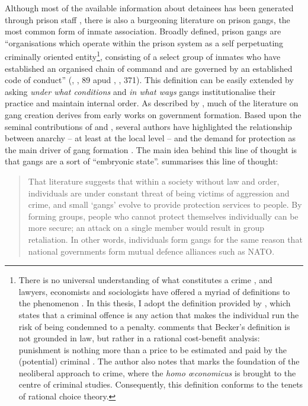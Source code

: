 Although most of the available information about detainees has been generated through prison staff \citep{fong1991detection, gaes2002influence}, there is also a burgeoning literature on prison gangs, the most common form of inmate association. Broadly defined, prison gangs are ``organisations which operate within the prison system as a self perpetuating criminally oriented entity\footnote{There is no universal understanding of what constitutes a crime \citep{gillani2009unemployment, hirschi1990substantive}, and lawyers, economists and sociologists have offered a myriad of definitions to the phenomenon \citep[]{henry2001crime}. In this thesis, I adopt the definition provided by \citet[]{becker1968crime}, which states that a criminal offence is any action that makes the individual run the risk of being condemned to a penalty. \citet[]{foucault2010birth} comments that Becker's definition is not grounded in law, but rather in a rational cost-benefit analysis: punishment is nothing more than a price to be estimated and paid by the (potential) criminal \citep{dilts2009michel, donohue2007economic}. The author also notes that \citet[]{becker1968crime} marks the foundation of the neoliberal approach to crime, where the \textit{homo \oe conomicus} is brought to the centre of criminal studies. Consequently, this definition conforms to the tenets of rational choice theory.}, consisting of a select group of inmates who have established an organised chain of command and are governed by an established code of conduct'' (\citeauthor{lyman1989gangland}, \citeyear{lyman1989gangland}, 89 apud \citeauthor{delisi2004gang}, \citeyear{delisi2004gang}, 371). This definition can be easily extended by asking \textit{under what conditions} and \textit{in what ways} gangs institutionalise their practice and maintain internal order. As described by \citet[1000]{sobel2009youth}, much of the literature on gang creation derives from early works on government formation. Based upon the seminal contributions of \cite{nozick1974anarchy} and \cite{buchanan1975limits}, several authors have highlighted the relationship between anarchy -- at least at the local level -- and the demand for protection as the main driver of gang formation  \citep{bandiera2003land, konrad2012market, skaperdas19973, skaperdas2001political}. The main idea behind this line of thought is that gangs are a sort of ``embryonic state''. \citet[]{sobel2010moregangs} summarises this line of thought: 

\begin{quotation}
That literature suggests that within a society without law and order, individuals are under constant threat of being victims of aggression and crime, and small `gangs' evolve to provide protection services to people. By forming groups, people who cannot protect themselves individually can be more secure; an attack on a single member would result in group retaliation. In other words, individuals form gangs for the same reason that national governments form mutual defence alliances such as NATO.
\end{quotation}

